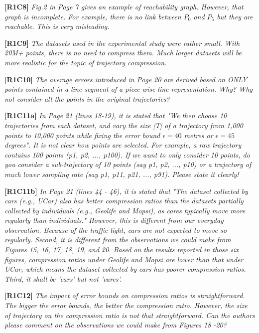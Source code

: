 \documentclass{letter}
\begin{document}
\textbf{[R1C8]} \emph{ Fig.2 in Page 7 gives an example of reachability graph. However, that graph is incomplete. For example, there is no link between $P_0$ and $P_5$ but they are reachable. This is very misleading. }

\textbf{[R1C9]} \emph{ The datasets used in the experimental study were rather small. With 20M+ points, there is no need to compress them. Much larger datasets will be more realistic for the topic of trajectory compression.  }

\textbf{[R1C10]} \emph{The average errors introduced in Page 20 are derived based on ONLY points contained in a line segment of a piece-wise line representation. Why? Why not consider all the points in the original trajectories? }

\textbf{[R1C11a]} \emph{ In Page 21 (lines 18-19), it is stated that "We then choose 10 trajectories from each dataset, and vary the size |T| of a trajectory from 1,000 points to 10,000 points while fixing the error bound $\epsilon = 40$ metres or $\epsilon = 45$ degrees". It is not clear how points are selected. For example, a raw trajectory contains 100 points (p1, p2, ..., p100). If we want to only consider 10 points, do you consider a sub-trajectory of 10 points (say p1, p2, ..., p10) or a trajectory of much lower sampling rate (say p1, p11, p21, ..., p91). Please state it clearly!}

\textbf{[R1C11b]} \emph{ In Page 21 (lines 44 - 46), it is stated that "The dataset collected by cars (e.g., UCar) also has better compression ratios than the datasets partially collected by individuals (e.g., Geolife and Mopsi), as cares typically move more regularly than individuals." However, this is different from our everyday observation. Because of the traffic light, cars are not expected to move so regularly. Second, it is different from the observations we could make from Figures 15, 16, 17, 18, 19, and 20. Based on the results reported in those six figures, compression ratios under Geolife and Mopsi are lower than that under UCar, which means the dataset collected by cars has poorer compression ratios. Third, it shall be 'cars' but not 'cares'. }

\textbf{[R1C12]} \emph{ The impact of error bounds on compression ratios is straightforward. The bigger the error bounds, the better the compression ratio. However, the size of trajectory on the compression ratio is not that straightforward. Can the authors please comment on the observations we could make from Figures 18 -20? }
\end{document}
